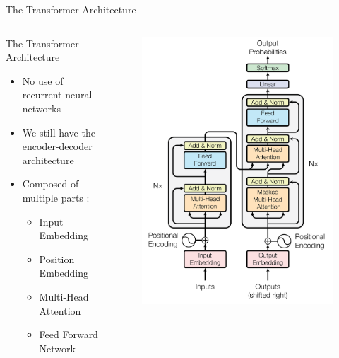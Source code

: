 \documentclass[aspectratio=169]{beamer}
\begin{document}
\begin{frame}{The Transformer Architecture}
\begin{columns}
\begin{column}{0.5\textwidth}
   \centering The Transformer Architecture \cite{vaswani2017attention}
   \vspace{.5cm}
   
   \raggedright
   \begin{itemize}
   	\item No use of recurrent neural networks
	\item We still have the encoder-decoder architecture
	\item Composed of multiple parts :
	\begin{itemize}
		\item Input Embedding
		\item Position Embedding
		\item Multi-Head Attention
		\item Feed Forward Network
	\end{itemize}
   \end{itemize}
\end{column}
\begin{column}{0.5\textwidth}  %
    \begin{center}
    \vspace{-1.3cm}
    \begin{figure}
    \begin{overprint}
    	 \includegraphics[height=\paperheight]{figures/transformer}

\end{overprint}
\end{figure}
\end{center}
\end{column}
\end{columns}
\end{frame}
\end{document}
